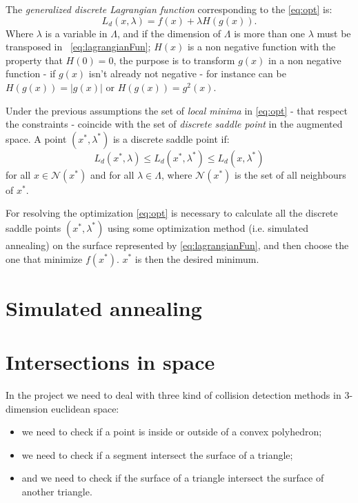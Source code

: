 \documentclass[dissertation.tex]{subfiles}
\begin{document}
The \emph{generalized discrete Lagrangian
  function} corresponding to the \cref{eq:opt} is:
\begin{equation}\label{eq:lagrangianFun}
  L_d(x,\lambda)=f(x)+\lambda H(g(x)).
\end{equation}
Where $\lambda$ is a variable in $\Lambda$, and if the dimension of
$\Lambda$ is more than one $\lambda$ must be transposed in
~\cref{eq:lagrangianFun}; $H(x)$ is a non negative function
with the property that $H(0)=0$, the purpose is to transform $g(x)$ in
a non negative function - if $g(x)$ isn't already not negative - for
instance can be $H(g(x))=|g(x)|$ or $H(g(x))=g^2(x)$.

Under the previous assumptions the set of \emph{local minima}
in \cref{eq:opt} - that respect the constraints -  coincide
with the set of \emph{discrete saddle point}
in the augmented space. A point $(x^*,\lambda^*)$ is a discrete saddle
point if:
\begin{equation*}
  L_d(x^*,\lambda)\leq L_d(x^*,\lambda^*)\leq L_d(x,\lambda^*)
\end{equation*}
for all $x\in\mathcal{N}(x^*)$ and for all $\lambda\in\Lambda$, where
$\mathcal{N}(x^*)$ is the set of all neighbours of $x^*$.

For resolving the optimization \cref{eq:opt} is necessary to
calculate all the discrete saddle points $(x^*,\lambda^*)$ using some
optimization method (i.e. simulated annealing) on the surface
represented by
\cref{eq:lagrangianFun}, and then choose
the one that minimize $f(x^*)$. $x^*$ is then the desired minimum.

\section{Simulated annealing}

\section{Intersections in space}\label{sec:intersections}
In the project we need to deal with three kind of collision detection
methods in 3-dimension euclidean space:
\begin{itemize}
\item we need to check if a point is inside or outside
  of a convex polyhedron;
\item we need to check if a segment intersect the
  surface of a triangle;
\item and we need to check if the surface of a
  triangle intersect the surface of another triangle.
\end{itemize}
\end{document}
